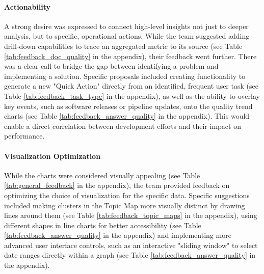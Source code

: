 \documentclass[
	english,
	ruledheaders=section,%
	class=report,%
	thesis={type=bachelor},%
	accentcolor=1b,%
	custommargins=true,%
	marginpar=false,%
	parskip=half-,%
	fontsize=11pt,%
	DIV=14,
]{tudapub}
\begin{document}
\paragraph{Actionability} A strong desire was expressed to connect high-level insights not just to deeper analysis, but to specific, operational actions. While the team suggested adding drill-down capabilities to trace an aggregated metric to its source (see Table \ref{tab:feedback_doc_quality} in the appendix), their feedback went further. There was a clear call to bridge the gap between identifying a problem and implementing a solution. Specific proposals included creating functionality to generate a new "Quick Action" directly from an identified, frequent user task (see Table  \ref{tab:feedback_task_type} in the appendix), as well as the ability to overlay key events, such as software releases or pipeline updates, onto the quality trend charts (see Table \ref{tab:feedback_answer_quality} in the appendix). This would enable a direct correlation between development efforts and their impact on performance.
\paragraph{Visualization Optimization} While the charts were considered visually appealing (see Table \ref{tab:general_feedback} in the appendix), the team provided feedback on optimizing the choice of visualization for the specific data. Specific suggestions included making clusters in the Topic Map more visually distinct by drawing lines around them (see Table \ref{tab:feedback_topic_maps} in the appendix), using different shapes in line charts for better accessibility (see Table \ref{tab:feedback_answer_quality} in the appendix) and implementing more advanced user interface controls, such as an interactive "sliding window" to select date ranges directly within a graph (see Table \ref{tab:feedback_answer_quality} in the appendix).
\end{document}
